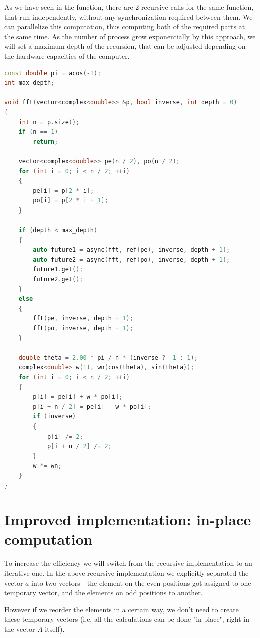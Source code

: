 \documentclass[12pt]{article}
\theoremstyle{definition}
\begin{document}
As we have seen in the  function, there are 2 recursive calls for the same function, that run independently, without any synchronization required between them. We can parallelize this computation, thus computing both of the required parts at the same time. As the number of process grow exponentially by this approach, we will set a maximum depth of the recursion, that can be adjusted depending on the hardware capacities of the computer. 
\begin{lstlisting}[language=C++, caption={Recursive parallelized implementation of the code.}]
const double pi = acos(-1);
int max_depth;

void fft(vector<complex<double>> &p, bool inverse, int depth = 0)
{
    int n = p.size();
    if (n == 1)
        return;

    vector<complex<double>> pe(n / 2), po(n / 2);
    for (int i = 0; i < n / 2; ++i)
    {
        pe[i] = p[2 * i];
        po[i] = p[2 * i + 1];
    }

    if (depth < max_depth)
    {
        auto future1 = async(fft, ref(pe), inverse, depth + 1);
        auto future2 = async(fft, ref(po), inverse, depth + 1);
        future1.get();
        future2.get();
    }
    else
    {
        fft(pe, inverse, depth + 1);
        fft(po, inverse, depth + 1);
    }

    double theta = 2.00 * pi / n * (inverse ? -1 : 1);
    complex<double> w(1), wn(cos(theta), sin(theta));
    for (int i = 0; i < n / 2; ++i)
    {
        p[i] = pe[i] + w * po[i];
        p[i + n / 2] = pe[i] - w * po[i];
        if (inverse)
        {
            p[i] /= 2;
            p[i + n / 2] /= 2;
        }
        w *= wn;
    }
}
\end{lstlisting}

\section{Improved implementation: in-place computation}

To increase the efficiency we will switch from the recursive implementation to an iterative one. In the above recursive implementation we explicitly separated the vector $a$ into two vectors - the element on the even positions got assigned to one temporary vector, and the elements on odd positions to another.

However if we reorder the elements in a certain way, we don't need to create these temporary vectors (i.e. all the calculations can be done "in-place", right in the vector $A$ itself).
\end{document}
